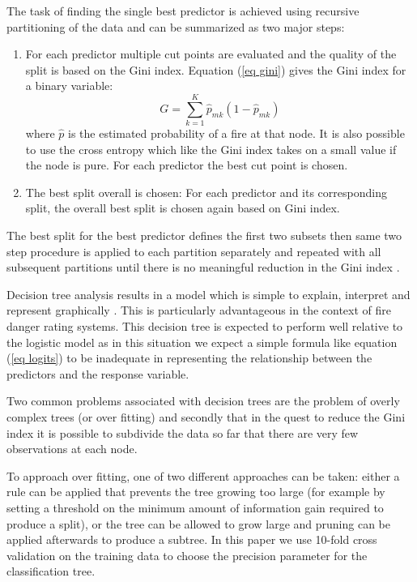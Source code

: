 \documentclass[11pt,a4paper]{article}
\begin{document}
The task of finding the single best predictor is achieved using recursive partitioning of the data and can be summarized as two major steps:
\begin{enumerate}
  \item For each predictor multiple cut points are evaluated and the quality of the split is based on the Gini index. Equation (\ref{eq gini}) gives the Gini index for a binary variable:
  \begin{equation}
          \label{eq gini}
          G=\sum_{k=1}^{K} \hat{p}_{mk} (1-\hat{p}_{mk})
  \end{equation}
  where $\hat{p}$ is the estimated probability of a fire at that node. It is also possible to use the cross entropy \citep{james13} which like the Gini index takes on a small value if the node is pure. For each predictor the best cut point is chosen.
  \item The best split overall is chosen:  For each predictor and its corresponding split, the overall best split is chosen again based on Gini index.
\end{enumerate}

The best split for the best predictor defines the first two subsets then same two step procedure is applied to each partition separately and repeated with all subsequent partitions until there is no meaningful reduction in the Gini index \citep{berk08,james13}.

Decision tree analysis results in a model which is simple to explain, interpret and represent graphically \citep{james13}. This is particularly advantageous in the context of fire danger rating systems.
This decision tree is expected to perform well relative to the logistic model as in this situation we expect a simple formula like equation (\ref{eq logits}) to be inadequate in representing the relationship between the predictors and the response variable.

Two common problems associated with decision trees are the problem of overly complex trees (or over fitting) and secondly that in the quest to reduce the Gini index it is possible to subdivide the data so far that there are very few observations at each node.

To approach over fitting, one of two different approaches can be taken: either a rule can be applied that prevents the tree growing too large (for example by setting a threshold on the minimum amount of information gain required to produce a split), or the tree can be allowed to grow large and pruning can be applied afterwards to produce a subtree. In this paper we use 10-fold cross validation on the training data to choose the precision parameter for the classification tree.
\end{document}
